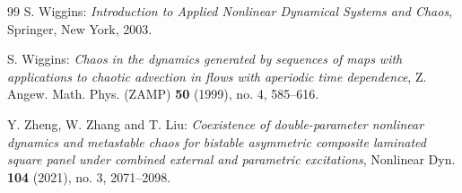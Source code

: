 \documentclass[10pt]{article}
\numberwithin{equation}{section}
\theoremstyle{definition}
\theoremstyle{remark}
\begin{document}
\begin{thebibliography}{99}
 {\sc S. Wiggins}: {\it Introduction to Applied Nonlinear Dynamical Systems and Chaos},
Springer, New York, 2003.

 {\sc S. Wiggins}: {\it Chaos in the dynamics generated by sequences of maps
with applications to chaotic advection in flows with aperiodic
time dependence}, Z. Angew. Math. Phys. (ZAMP) {\bf 50} (1999),  no. 4, 585--616.




 {\sc Y. Zheng, W. Zhang and T. Liu}: {\it Coexistence of double-parameter nonlinear dynamics and metastable chaos for bistable
    asymmetric composite laminated square panel under combined external and parametric excitations},
Nonlinear Dyn. {\bf 104} (2021), no. 3, 2071--2098.


\end{thebibliography}
\end{document}
